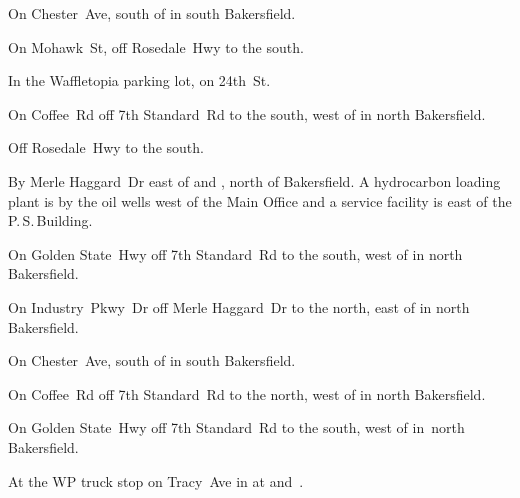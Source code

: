 
\begin{LocationList}

On Chester~Ave, south of  in south Bakersfield.

On Mohawk~St, off  Rosedale~Hwy to the south.

In the Waffletopia parking lot, on   24th~St.

On Coffee~Rd off 7th Standard~Rd to the south, west of  in north Bakersfield.

Off  Rosedale~Hwy to the south.

By Merle Haggard~Dr east of  and , north of Bakersfield.
A hydrocarbon loading plant is by the oil wells west of the Main Office and a service facility is east of the P.\,S.\,Building.

\Location{\GarageHQ \Garage}
On Golden State~Hwy off 7th Standard~Rd to the south, west of  in north Bakersfield.

On Industry~Pkwy~Dr off Merle Haggard~Dr to the north, east of  in north Bakersfield.

On Chester~Ave, south of  in south Bakersfield.

On Coffee~Rd off 7th Standard~Rd to the north, west of  in north Bakersfield.

On Golden State~Hwy off 7th Standard~Rd to the south, west of  in~north Bakersfield.

At the WP truck stop on Tracy~Ave in  at  and~.

\end{LocationList}
